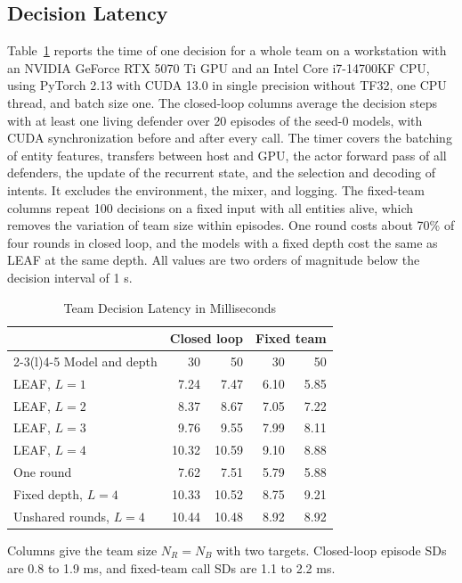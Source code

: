 \subsection{Decision Latency}
Table~\ref{tab:s-latency} reports the time of one decision for a whole team on a workstation with an NVIDIA GeForce RTX 5070 Ti GPU and an Intel Core i7-14700KF CPU, using PyTorch 2.13 with CUDA 13.0 in single precision without TF32, one CPU thread, and batch size one. The closed-loop columns average the decision steps with at least one living defender over 20 episodes of the seed-0 models, with CUDA synchronization before and after every call. The timer covers the batching of entity features, transfers between host and GPU, the actor forward pass of all defenders, the update of the recurrent state, and the selection and decoding of intents. It excludes the environment, the mixer, and logging. The fixed-team columns repeat 100 decisions on a fixed input with all entities alive, which removes the variation of team size within episodes. One round costs about 70\% of four rounds in closed loop, and the models with a fixed depth cost the same as LEAF at the same depth. All values are two orders of magnitude below the decision interval of 1 s.

\begin{table}[!t]
\centering
\scriptsize
\setlength{\tabcolsep}{3pt}
\caption{Team Decision Latency in Milliseconds}
\label{tab:s-latency}
\begin{tabular}{@{}lrrrr@{}}
\toprule
 & \multicolumn{2}{c}{Closed loop} & \multicolumn{2}{c}{Fixed team}\\
\cmidrule(lr){2-3}\cmidrule(l){4-5}
Model and depth & 30 & 50 & 30 & 50\\
\midrule
LEAF, $L=1$ & 7.24 & 7.47 & 6.10 & 5.85\\
LEAF, $L=2$ & 8.37 & 8.67 & 7.05 & 7.22\\
LEAF, $L=3$ & 9.76 & 9.55 & 7.99 & 8.11\\
LEAF, $L=4$ & 10.32 & 10.59 & 9.10 & 8.88\\
One round & 7.62 & 7.51 & 5.79 & 5.88\\
Fixed depth, $L=4$ & 10.33 & 10.52 & 8.75 & 9.21\\
Unshared rounds, $L=4$ & 10.44 & 10.48 & 8.92 & 8.92\\
\bottomrule
\end{tabular}
\par\smallskip
\parbox{\columnwidth}{\scriptsize Columns give the team size $N_R=N_B$ with two targets. Closed-loop episode SDs are 0.8 to 1.9 ms, and fixed-team call SDs are 1.1 to 2.2 ms.}
\end{table}

